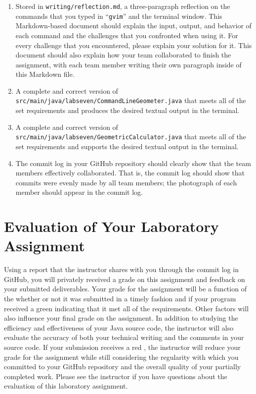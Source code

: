 \documentclass[11pt]{article}
\newcommand{\mainprogramsource}{\lstinline{src/main/java/labseven/CommandLineGeometer.java}}
\newcommand{\secondprogramsource}{\lstinline{src/main/java/labseven/GeometricCalculator.java}}
\newcommand{\reflection}{\lstinline{writing/reflection.md}}
\newcommand{\command}[1]{``\lstinline{#1}''}
\newcommand{\checkmark}{\ding{51}}
\newcommand{\naughtmark}{\ding{55}}
\begin{document}
\begin{enumerate}

  \setlength{\itemsep}{0in}

\item Stored in \reflection{}, a three-paragraph reflection on the commands that you typed in \command{gvim} and the
  terminal window. This Markdown-based document should explain the input, output, and behavior of each command and the
  challenges that you confronted when using it. For every challenge that you encountered, please explain your solution
  for it. This document should also explain how your team collaborated to finish the assignment, with each team member
  writing their own paragraph inside of this Markdown file.

\item A complete and correct version of \mainprogramsource{} that meets all of the set requirements and produces the
  desired textual output in the terminal.

\item A complete and correct version of \secondprogramsource{} that meets all of the set requirements and supports the
  desired textual output in the terminal.

\item The commit log in your GitHub repository should clearly show that the team members effectively collaborated. That
  is, the commit log should show that commits were evenly made by all team members; the photograph of each member should
  appear in the commit log.

\end{enumerate}

\section*{Evaluation of Your Laboratory Assignment}

Using a report that the instructor shares with you through the commit log in GitHub, you will privately received a grade
on this assignment and feedback on your submitted deliverables. Your grade for the assignment will be a function of the
whether or not it was submitted in a timely fashion and if your program received a green \checkmark{} indicating that it
met all of the requirements. Other factors will also influence your final grade on the assignment. In addition to
studying the efficiency and effectiveness of your Java source code, the instructor will also evaluate the accuracy of
both your technical writing and the comments in your source code. If your submission receives a red \naughtmark{}, the
instructor will reduce your grade for the assignment while still considering the regularity with which you committed to
your GitHub repository and the overall quality of your partially completed work. Please see the instructor if you have
questions about the evaluation of this laboratory assignment.
\end{document}
